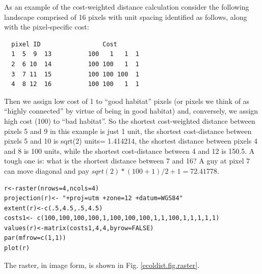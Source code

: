 As an example of the cost-weighted distance calculation consider the
following landscape comprised of 16 pixels with unit spacing 
identified as follows, along with the pixel-specific cost:
\begin{verbatim}
  pixel ID                 Cost
  1  5  9  13          100   1   1  1
  2  6 10  14          100 100   1  1
  3  7 11  15          100 100 100  1
  4  8 12  16          100 100   1  1 
\end{verbatim}
Then we assign low cost of 1 to ``good habitat'' pixels (or pixels we
think of as ``highly connected'' by virtue of being in good habitat)
and, conversely, we assign high cost (100) to ``bad habitat''. So the
shortest cost-weighted distance between pixels 5 and 9 in this example
is just 1 unit, the shortest cost-distance between pixels 5 and 10 is
sqrt(2) units= 1.414214, the shortest distance between pixels 4 and 8 is 100
units, while the shortest cost-distance between 4 and 12 is 150.5. A
tough one is: what is the shortest distance between 7 and 16? A guy at pixel
7 can move diagonal and pay  $sqrt(2)*(100+1)/2 + 1 =72.41778$.

\begin{verbatim}
r<-raster(nrows=4,ncols=4)
projection(r)<- "+proj=utm +zone=12 +datum=WGS84"
extent(r)<-c(.5,4.5,.5,4.5)
costs1<- c(100,100,100,100,1,100,100,100,1,1,100,1,1,1,1,1)
values(r)<-matrix(costs1,4,4,byrow=FALSE)
par(mfrow=c(1,1))
plot(r)
\end{verbatim}
The raster, in image form, is shown in Fig. \ref{ecoldist.fig.raster}.


